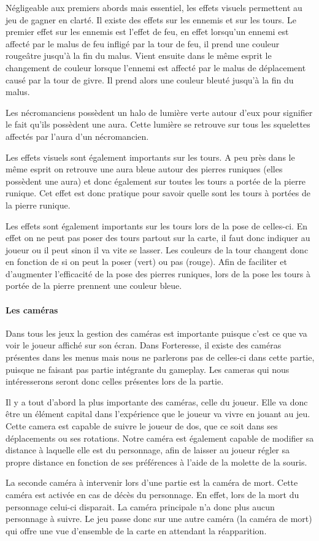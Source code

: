 \documentclass[a4paper, 12pt]{article}
\begin{document}
			Négligeable aux premiers abords mais essentiel, les effets visuels permettent au jeu de gagner en clarté. Il existe des effets sur les ennemis et sur les tours. 
Le premier effet sur les ennemis est l’effet de feu, en effet lorsqu’un ennemi est affecté par le malus de feu infligé par la tour de feu, il prend une couleur rougeâtre jusqu’à la fin du malus.
Vient ensuite dans le même esprit le changement de couleur lorsque l’ennemi est affecté par le malus de déplacement causé par la tour de givre. Il prend alors une couleur bleuté jusqu’à la fin du malus.
\par Les nécromanciens possèdent un halo de lumière verte autour d’eux pour signifier le fait qu’ils possèdent une aura. Cette lumière se retrouve sur tous les squelettes affectés par l’aura d’un nécromancien. 
\par Les effets visuels sont également importants sur les tours. A peu près dans le même esprit on retrouve une aura bleue autour des pierres runiques (elles possèdent une aura) et donc également sur toutes les tours a portée de la pierre runique. Cet effet est donc pratique pour savoir quelle sont les tours à portées de la pierre runique.
\par Les effets sont également importants sur les tours lors de la pose de celles-ci. En effet on ne peut pas poser des tours partout sur la carte, il faut donc indiquer au joueur ou il peut sinon il va vite se lasser. Les couleurs de la tour changent donc en fonction de si on peut la poser (vert) ou pas (rouge). Afin de faciliter et d’augmenter l’efficacité de la pose des pierres runiques, lors de la pose les tours à portée de la pierre prennent une couleur bleue.

			\paragraph{Les caméras}
			
			Dans tous les jeux la gestion des caméras est importante puisque c’est ce que va voir le joueur affiché sur son écran. Dans Forteresse, il existe des caméras présentes dans les menus mais nous ne parlerons pas de celles-ci dans cette partie, puisque ne faisant pas partie intégrante du gameplay. Les cameras qui nous intéresserons seront donc celles présentes lors de la partie.
\par Il y a tout d’abord la plus importante des caméras, celle du joueur. Elle va donc être un élément capital dans l’expérience que le joueur va vivre en jouant au jeu. Cette camera est capable de suivre le joueur de dos, que ce soit dans ses déplacements ou ses rotations. Notre caméra est également capable de modifier sa distance à laquelle elle est du personnage, afin de laisser au joueur régler sa propre distance en fonction de ses préférences \`a l'aide de la molette de la souris. 
\par La seconde caméra à intervenir lors d’une partie est la caméra de mort. Cette caméra est activée en cas de décès du personnage. En effet, lors de la mort du personnage celui-ci disparait. La caméra principale n’a donc plus aucun personnage à suivre. Le jeu passe donc sur une autre caméra (la caméra de mort) qui offre une vue d’ensemble de la carte en attendant la réapparition.
\end{document}
